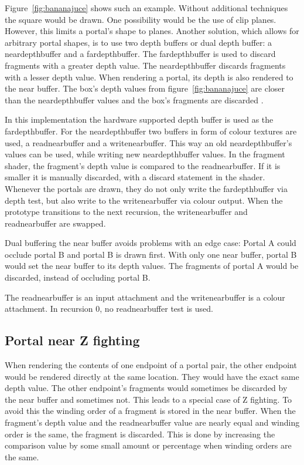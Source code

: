 Figure~\ref{fig:bananajuce} shows such an example. Without additional techniques the square would be drawn. One possibility would be the use of clip planes. However, this limits a portal's shape to planes. Another solution, which allows for arbitrary portal shapes, is to use two depth buffers or dual depth buffer: a \gls{neardepthbuffer} and a \gls{fardepthbuffer}. The \gls{fardepthbuffer} is used to discard fragments with a greater depth value. The \gls{neardepthbuffer} discards fragments with a lesser depth value. When rendering a portal, its depth is also rendered to the near buffer. The box's depth values from figure~\ref{fig:bananajuce} are closer than the \gls{neardepthbuffer} values and the box's fragments are discarded \cite{lowe:2005:technique, ropinski:2004:real}.

In this implementation the hardware supported depth buffer is used as the \gls{fardepthbuffer}. For the \gls{neardepthbuffer} two buffers in form of colour textures are used, a \gls{readnearbuffer} and a \gls{writenearbuffer}. This way an old \gls{neardepthbuffer}'s values can be used, while writing new \gls{neardepthbuffer} values. In the fragment shader, the fragment's depth value is compared to the \gls{readnearbuffer}. If it is smaller it is manually discarded, with a discard statement in the shader. Whenever the portals are drawn, they do not only write the \gls{fardepthbuffer} via depth test, but also write to the \gls{writenearbuffer} via colour output. When the prototype transitions to the next recursion, the \gls{writenearbuffer} and \gls{readnearbuffer} are swapped.

Dual buffering the near buffer avoids problems with an edge case: Portal A could occlude portal B and portal B is drawn first. With only one near buffer, portal B would set the near buffer to its depth values. The fragments of portal A would be discarded, instead of occluding portal B.

The \gls{readnearbuffer} is an input attachment and the \gls{writenearbuffer} is a colour attachment. In recursion 0, no \gls{readnearbuffer} test is used.

\subsection{Portal near Z fighting}
\label{section:portalzfighting}
When rendering the contents of one endpoint of a portal pair, the other endpoint would be rendered directly at the same location. They would have the exact same depth value. The other endpoint's fragments would sometimes be discarded by the near buffer and sometimes not. This leads to a special case of Z fighting. To avoid this the winding order of a fragment is stored in the near buffer. When the fragment's depth value and the \gls{readnearbuffer} value are nearly equal and winding order is the same, the fragment is discarded. This is done by increasing the comparison value by some small amount or percentage when winding orders are the same.

